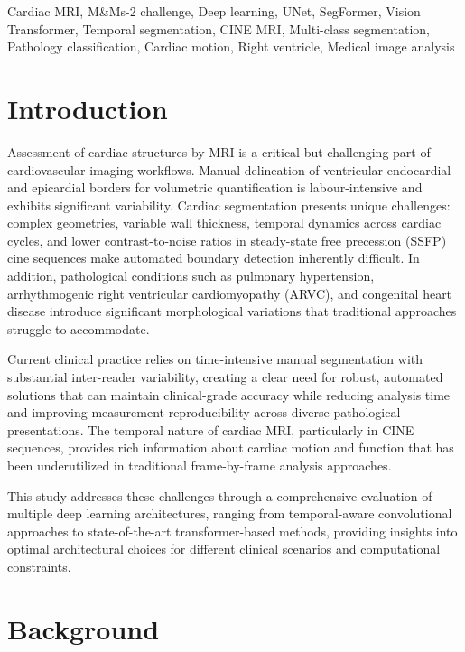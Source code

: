 \documentclass[twoside,11pt]{article}
\begin{document}
  \begin{keywords}
    Cardiac MRI, M\&Ms-2 challenge, Deep learning, UNet, SegFormer, Vision Transformer, Temporal segmentation, CINE MRI, Multi-class segmentation, Pathology classification, Cardiac motion, Right ventricle, Medical image analysis
  \end{keywords}

  \section{Introduction}

    Assessment of cardiac structures by MRI is a critical but challenging part of cardiovascular imaging workflows. Manual delineation of ventricular endocardial and epicardial borders for volumetric quantification is labour-intensive and exhibits significant variability. Cardiac segmentation presents unique challenges: complex geometries, variable wall thickness, temporal dynamics across cardiac cycles, and lower contrast-to-noise ratios in steady-state free precession (SSFP) cine sequences make automated boundary detection inherently difficult. In addition, pathological conditions such as pulmonary hypertension, arrhythmogenic right ventricular cardiomyopathy (ARVC), and congenital heart disease introduce significant morphological variations that traditional approaches struggle to accommodate.
    
    Current clinical practice relies on time-intensive manual segmentation with substantial inter-reader variability, creating a clear need for robust, automated solutions that can maintain clinical-grade accuracy while reducing analysis time and improving measurement reproducibility across diverse pathological presentations. The temporal nature of cardiac MRI, particularly in CINE sequences, provides rich information about cardiac motion and function that has been underutilized in traditional frame-by-frame analysis approaches.
    
    This study addresses these challenges through a comprehensive evaluation of multiple deep learning architectures, ranging from temporal-aware convolutional approaches to state-of-the-art transformer-based methods, providing insights into optimal architectural choices for different clinical scenarios and computational constraints.

  \section{Background}
\end{document}
